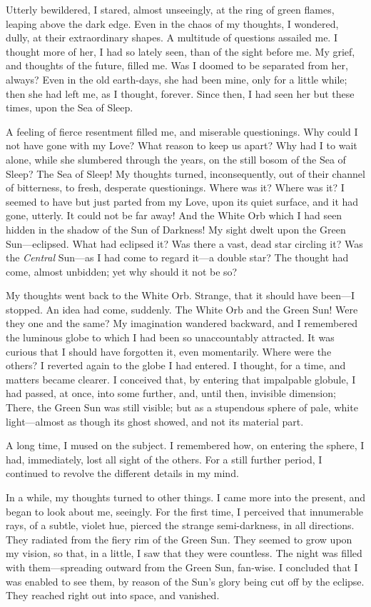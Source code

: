Utterly bewildered, I stared, almost unseeingly, at the ring of green flames, leaping above the dark edge. Even in the chaos of my thoughts, I wondered, dully, at their extraordinary shapes. A multitude of questions assailed me. I thought more of her, I had so lately seen, than of the sight before me. My grief, and thoughts of the future, filled me. Was I doomed to be separated from her, always? Even in the old earth-days, she had been mine, only for a little while; then she had left me, as I thought, forever. Since then, I had seen her but these times, upon the Sea of Sleep.

A feeling of fierce resentment filled me, and miserable questionings. Why could I not have gone with my Love? What reason to keep us apart? Why had I to wait alone, while she slumbered through the years, on the still bosom of the Sea of Sleep? The Sea of Sleep! My thoughts turned, inconsequently, out of their channel of bitterness, to fresh, desperate questionings. Where was it? Where was it? I seemed to have but just parted from my Love, upon its quiet surface, and it had gone, utterly. It could not be far away! And the White Orb which I had seen hidden in the shadow of the Sun of Darkness! My sight dwelt upon the Green Sun---eclipsed. What had eclipsed it? Was there a vast, dead star circling it? Was the \textit{Central} Sun---as I had come to regard it---a double star? The thought had come, almost unbidden; yet why should it not be so?

My thoughts went back to the White Orb. Strange, that it should have been---I stopped. An idea had come, suddenly. The White Orb and the Green Sun! Were they one and the same? My imagination wandered backward, and I remembered the luminous globe to which I had been so unaccountably attracted. It was curious that I should have forgotten it, even momentarily. Where were the others? I reverted again to the globe I had entered. I thought, for a time, and matters became clearer. I conceived that, by entering that impalpable globule, I had passed, at once, into some further, and, until then, invisible dimension; There, the Green Sun was still visible; but as a stupendous sphere of pale, white light---almost as though its ghost showed, and not its material part.

A long time, I mused on the subject. I remembered how, on entering the sphere, I had, immediately, lost all sight of the others. For a still further period, I continued to revolve the different details in my mind.

In a while, my thoughts turned to other things. I came more into the present, and began to look about me, seeingly. For the first time, I perceived that innumerable rays, of a subtle, violet hue, pierced the strange semi-darkness, in all directions. They radiated from the fiery rim of the Green Sun. They seemed to grow upon my vision, so that, in a little, I saw that they were countless. The night was filled with them---spreading outward from the Green Sun, fan-wise. I concluded that I was enabled to see them, by reason of the Sun’s glory being cut off by the eclipse. They reached right out into space, and vanished.

